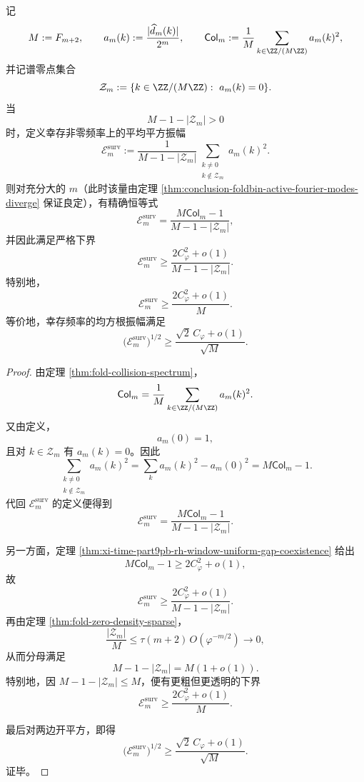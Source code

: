 \begin{theorem}[幸存非零频率的平均平方振幅具有严格的共振下界]\label{thm:conclusion-surviving-fourier-energy-lower-bound}
记
\[
M:=F_{m+2},
\qquad
a_m(k):=\frac{|\widehat d_m(k)|}{2^m},
\qquad
\mathsf{Col}_m:=\frac{1}{M}\sum_{k\in \ZZ/(M\ZZ)}a_m(k)^2,
\]
并记谱零点集合
\[
\mathcal Z_m:=\{k\in \ZZ/(M\ZZ):\ a_m(k)=0\}.
\]
当
\[
M-1-|\mathcal Z_m|>0
\]
时，定义幸存非零频率上的平均平方振幅
\[
\mathcal E_m^{\mathrm{surv}}
:=
\frac{1}{M-1-|\mathcal Z_m|}
\sum_{\substack{k\neq 0\\ k\notin \mathcal Z_m}}a_m(k)^2.
\]
则对充分大的 \(m\)（此时该量由定理 \ref{thm:conclusion-foldbin-active-fourier-modes-diverge} 保证良定），有精确恒等式
\[
\mathcal E_m^{\mathrm{surv}}
=
\frac{M\mathsf{Col}_m-1}{M-1-|\mathcal Z_m|},
\]
并因此满足严格下界
\[
\boxed{\;
\mathcal E_m^{\mathrm{surv}}
\ge
\frac{2C_\varphi^2+o(1)}{M-1-|\mathcal Z_m|}.\;}
\]
特别地，
\[
\boxed{\;
\mathcal E_m^{\mathrm{surv}}
\ge
\frac{2C_\varphi^2+o(1)}{M}.\;}
\]
等价地，幸存频率的均方根振幅满足
\[
\boxed{\;
\bigl(\mathcal E_m^{\mathrm{surv}}\bigr)^{1/2}
\ge
\frac{\sqrt{2}\,C_\varphi+o(1)}{\sqrt{M}}.\;}
\]
\end{theorem}
\begin{proof}
由定理 \ref{thm:fold-collision-spectrum}，
\[
\mathsf{Col}_m=\frac{1}{M}\sum_{k\in \ZZ/(M\ZZ)}a_m(k)^2.
\]
又由定义，
\[
a_m(0)=1,
\]
且对 \(k\in \mathcal Z_m\) 有 \(a_m(k)=0\)。因此
\[
\sum_{\substack{k\neq 0\\ k\notin \mathcal Z_m}}a_m(k)^2
=
\sum_{k}a_m(k)^2-a_m(0)^2
=
M\mathsf{Col}_m-1.
\]
代回 \(\mathcal E_m^{\mathrm{surv}}\) 的定义便得到
\[
\mathcal E_m^{\mathrm{surv}}
=
\frac{M\mathsf{Col}_m-1}{M-1-|\mathcal Z_m|}.
\]

另一方面，定理 \ref{thm:xi-time-part9pb-rh-window-uniform-gap-coexistence} 给出
\[
M\mathsf{Col}_m-1
\ge
2C_\varphi^2+o(1),
\]
故
\[
\mathcal E_m^{\mathrm{surv}}
\ge
\frac{2C_\varphi^2+o(1)}{M-1-|\mathcal Z_m|}.
\]
再由定理 \ref{thm:fold-zero-density-sparse}，
\[
\frac{|\mathcal Z_m|}{M}
\le
\tau(m+2)\,O(\varphi^{-m/2})
\to 0,
\]
从而分母满足
\[
M-1-|\mathcal Z_m|=M(1+o(1)).
\]
特别地，因 \(M-1-|\mathcal Z_m|\le M\)，便有更粗但更透明的下界
\[
\mathcal E_m^{\mathrm{surv}}
\ge
\frac{2C_\varphi^2+o(1)}{M}.
\]

最后对两边开平方，即得
\[
\bigl(\mathcal E_m^{\mathrm{surv}}\bigr)^{1/2}
\ge
\frac{\sqrt{2}\,C_\varphi+o(1)}{\sqrt{M}}.
\]
证毕。
\end{proof}

